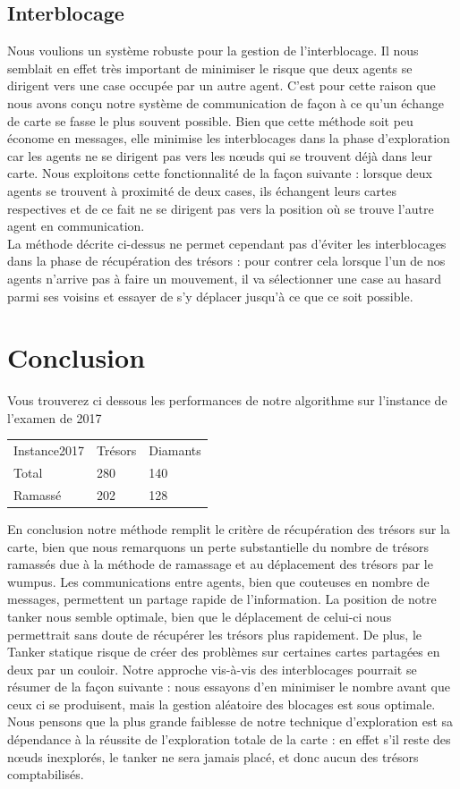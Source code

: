 \documentclass[10pt]{article}
\newcommand\tab[1][0.65cm]{\hspace*{#1}}
\begin{document}
	
\subsection{Interblocage}
\tab Nous voulions un système robuste pour la gestion de l'interblocage. Il nous semblait en effet très important de minimiser le risque que deux agents se dirigent vers une case occupée par un autre agent. C'est pour cette raison que nous avons conçu notre système de communication de façon à ce qu'un échange de carte se fasse le plus souvent possible. Bien que cette méthode soit peu économe en messages, elle minimise les interblocages dans la phase d'exploration car les agents ne se dirigent pas vers les n\oe{}uds qui se trouvent déjà dans leur carte. Nous exploitons cette fonctionnalité de la façon suivante : lorsque deux agents se trouvent à proximité de deux cases, ils échangent leurs cartes respectives et de ce fait ne se dirigent pas vers la position où se trouve l'autre agent en communication.\\
\tab La méthode décrite ci-dessus ne permet cependant pas d'éviter les interblocages dans la phase de récupération des trésors : pour contrer cela lorsque l'un de nos agents n'arrive pas à faire un mouvement, il va sélectionner une case au hasard parmi ses voisins et essayer de s'y déplacer jusqu'à ce que ce soit possible.

\section{Conclusion}
\tab Vous trouverez ci dessous les performances de notre algorithme sur l'instance de l'examen de 2017\\
\begin{center}
\begin{tabular}{lll}
   Instance2017 & Trésors & Diamants \\
   Total & 280 & 140\\
   Ramassé & 202 & 128 \\
\end{tabular}
\end{center}
\tab
En conclusion notre méthode remplit le critère de récupération des trésors sur la carte, bien que nous remarquons un perte substantielle du nombre de trésors ramassés due à la méthode de ramassage et au déplacement des trésors par le wumpus. Les communications entre agents, bien que couteuses en nombre de messages, permettent un partage rapide de l'information. La position de notre tanker nous semble optimale, bien que le déplacement de celui-ci nous permettrait sans doute de récupérer les trésors plus rapidement. De plus, le Tanker statique risque de créer des problèmes sur certaines cartes partagées en deux par un couloir. Notre approche vis-à-vis des interblocages pourrait se résumer de la façon suivante : nous essayons d'en minimiser le nombre avant que ceux ci se produisent, mais la gestion aléatoire des blocages est sous optimale. Nous pensons que la plus grande faiblesse de notre technique d'exploration est sa dépendance à la réussite de l'exploration totale de la carte : en effet s'il reste des n\oe{}uds inexplorés, le tanker ne sera jamais placé, et donc aucun des trésors comptabilisés. 
\end{document}
